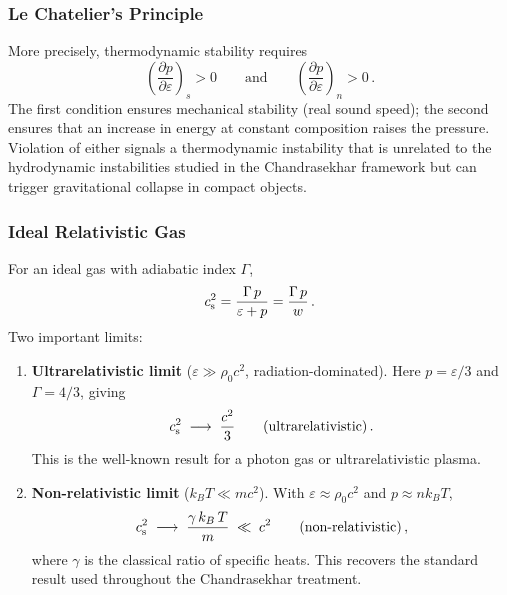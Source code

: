 \subsubsection{Le Chatelier's Principle}
More precisely, thermodynamic stability requires
\begin{equation}
  \left(\frac{\partial p}{\partial\varepsilon}\right)_{\!s} > 0
  \qquad\text{and}\qquad
  \left(\frac{\partial p}{\partial\varepsilon}\right)_{\!n} > 0 \,.
  \label{eq:le-chatelier}
\end{equation}
The first condition ensures mechanical stability (real sound speed);
the second ensures that an increase in energy at constant composition
raises the pressure.  Violation of either signals a thermodynamic
instability that is unrelated to the hydrodynamic instabilities studied
in the Chandrasekhar framework but can trigger gravitational collapse
in compact objects.

\subsubsection{Ideal Relativistic Gas}
For an ideal gas with adiabatic index $\Gamma$,
\begin{equation}
  c_{\mathrm{s}}^{2}
  = \frac{\Gamma\,p}{\varepsilon + p}
  = \frac{\Gamma\,p}{w}\,.
  \label{eq:cs-ideal}
\end{equation}
Two important limits:
\begin{enumerate}
  \item \textbf{Ultrarelativistic limit} ($\varepsilon \gg \rho_{0}c^{2}$,
    radiation-dominated).  Here $p = \varepsilon/3$ and $\Gamma = 4/3$,
    giving
    \begin{equation}
      c_{\mathrm{s}}^{2} \;\longrightarrow\; \frac{c^{2}}{3}
      \qquad\text{(ultrarelativistic)}\,.
      \label{eq:cs-ultrarel}
    \end{equation}
    This is the well-known result for a photon gas or
    ultrarelativistic plasma.

  \item \textbf{Non-relativistic limit} ($k_{B}T \ll mc^{2}$).
    With $\varepsilon \approx \rho_{0}c^{2}$ and $p \approx n k_{B}T$,
    \begin{equation}
      c_{\mathrm{s}}^{2} \;\longrightarrow\;
      \frac{\gamma\,k_{B}\,T}{m} \;\ll\; c^{2}
      \qquad\text{(non-relativistic)}\,,
      \label{eq:cs-nonrel}
    \end{equation}
    where $\gamma$ is the classical ratio of specific heats.  This
    recovers the standard result used throughout the Chandrasekhar
    treatment.
\end{enumerate}


